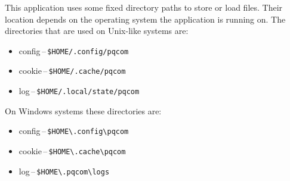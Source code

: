 This application uses some fixed directory paths to store or load files. Their location depends on the operating system the application is running on. The directories that are used on Unix-like systems are:
\begin{itemize}
  \item config\,--\,\texttt{\$HOME/.config/pqcom}
  \item cookie\,--\,\texttt{\$HOME/.cache/pqcom}
  \item log\,--\,\texttt{\$HOME/.local/state/pqcom}
\end{itemize}
\noindent On Windows systems these directories are:
\begin{itemize}
  \item config\,--\,\texttt{\$HOME\textbackslash .config\textbackslash pqcom}
  \item cookie\,--\,\texttt{\$HOME\textbackslash .cache\textbackslash pqcom}
  \item log\,--\,\texttt{\$HOME\textbackslash.pqcom\textbackslash logs}
\end{itemize}
